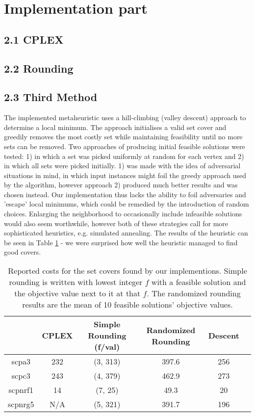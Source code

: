 \documentclass[12pt]{article}
\begin{document}
\pagebreak
\section*{Implementation part}
\subsection*{2.1 CPLEX}

\subsection*{2.2 Rounding}

\subsection*{2.3 Third Method}
The implemented metaheuristic uses a hill-climbing (valley descent) approach to determine a local minimum. The approach initialises a valid set cover and greedily removes the most costly set while maintaining feasibility until no more sets can be removed. Two approaches of producing initial feasible solutions were tested: 1) in which a set was picked uniformly at random for each vertex and 2) in which all sets were picked initially. 1) was made with the idea of adversarial situations in mind, in which input instances might foil the greedy approach used by the algorithm, however approach 2) produced much better results and was chosen instead. Our implementation thus lacks the ability to foil adversaries and 'escape' local minimums, which could be remedied by the introduction of random choices. Enlarging the neighborhood to occasionally include infeasible solutions would also seem worthwhile, however both of these strategies call for more sophisticated heuristics, e.g. simulated annealing. The results of the heuristic can be seen in Table \ref{times} - we were surprised how well the heuristic managed to find good covers.

\begin{table}[!hbt]
\center
\begin{tabular}{|c | c | c | c | c | c |}
\hline
& \multicolumn{1}{|c|}{CPLEX} & \multicolumn{1}{|c|}{Simple Rounding (f/val)} & Randomized Rounding & \multicolumn{1}{|c|}{Descent} \\
\hline
scpa3 & 232 & (3, 313) & 397.6 & 256 \\
\hline
scpc3 & 243 & (4, 379) & 462.9 & 273 \\
\hline
scpnrf1 & 14 & (7, 25) & 49.3 & 20 \\
\hline
scpnrg5 & N/A & (5, 321) & 391.7 & 196 \\
\hline 
\end{tabular}
\caption{Reported costs for the set covers found by our implementions. Simple rounding is written with lowest integer $f$ with a feasible solution and the objective value next to it at that $f$. The randomized rounding results are the mean of 10 feasible solutions' objective values.
\label{times}}
\end{table}
\end{document}
